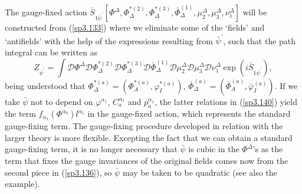 \documentclass[a4paper,12pt]{article}
\begin{document}
The gauge-fixed action $\bar{S}_{1\bar{\psi}^{\prime }}\left[ \Phi ^{\Delta
},\Phi _{\Delta }^{*(2)},\Phi _{\Delta }^{*(3)},\bar{\Phi}_{\Delta
}^{(1)},\mu _{2}^{\Delta },\mu _{3}^{\Delta },\nu _{1}^{\Delta }\right] $
will be constructed from (\ref{sp3.133}) where we eliminate some of the
`fields' and `antifields' with the help of the expressions resulting from $%
\bar{\psi}^{\prime }$, such that the path integral can be written as 
\begin{equation}
Z_{\bar{\psi}^{\prime }}=\int \mathcal{D}\Phi ^{\Delta }\mathcal{D}\Phi
_{\Delta }^{*(2)}\mathcal{D}\Phi _{\Delta }^{*(3)}\mathcal{D}\bar{\Phi}%
_{\Delta }^{(1)}\mathcal{D}\mu _{2}^{\Delta }\mathcal{D}\mu _{3}^{\Delta }%
\mathcal{D}\nu _{1}^{\Delta }\exp \left( i\bar{S}_{1\bar{\psi}^{\prime
}}\right) ,  \label{sp3.141}
\end{equation}
being understood that $\Phi _{\Delta }^{*(a)}=\left( \Phi
_{A}^{*(a)},\varphi _{I}^{*(a)}\right) $, $\bar{\Phi}_{\Delta }^{(a)}=\left( 
\bar{\Phi}_{A}^{(a)},\bar{\varphi}_{I}^{(a)}\right) $. If we take $\bar{\psi}
$ not to depend on $\varphi ^{\alpha _{1}}$, $C_{a}^{\alpha _{1}}$ and $%
p_{a}^{\alpha _{1}}$, the latter relations in (\ref{sp3.140}) yield the term 
$f_{\alpha _{1}}\left( \Phi ^{\alpha _{0}}\right) l^{\alpha _{1}}$ in the
gauge-fixed action, which represents the standard gauge-fixing term. The
gauge-fixing procedure developed in relation with the larger theory is more
flexible. Excepting the fact that we can obtain a standard gauge-fixing
term, it is no longer necessary that $\bar{\psi}$ is cubic in the $\Phi
^{\Delta }$'s as the term that fixes the gauge invariances of the original
fields comes now from the second piece in (\ref{sp3.136}), so $\bar{\psi}$
may be taken to be quadratic (see also the example).
\end{document}
